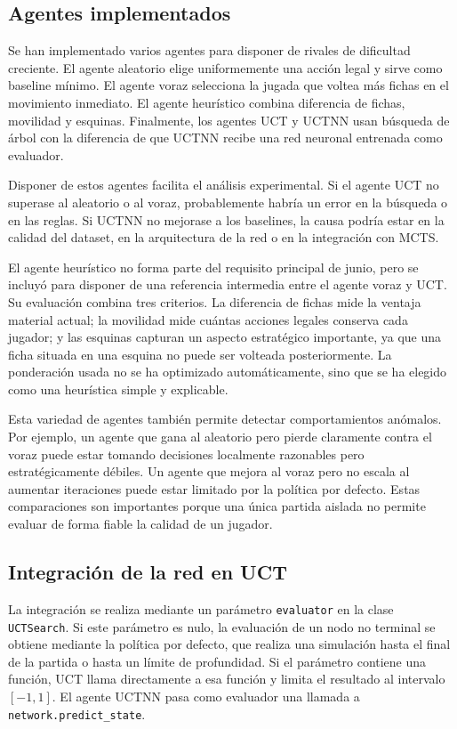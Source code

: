 \documentclass[conference,a4paper]{IEEEtran}
\begin{document}
\subsection{Agentes implementados}

Se han implementado varios agentes para disponer de rivales de dificultad
creciente. El agente aleatorio elige uniformemente una acción legal y sirve como
baseline mínimo. El agente voraz selecciona la jugada que voltea más fichas en
el movimiento inmediato. El agente heurístico combina diferencia de fichas,
movilidad y esquinas. Finalmente, los agentes UCT y UCTNN usan búsqueda de árbol
con la diferencia de que UCTNN recibe una red neuronal entrenada como evaluador.

Disponer de estos agentes facilita el análisis experimental. Si el agente UCT no
superase al aleatorio o al voraz, probablemente habría un error en la búsqueda o
en las reglas. Si UCTNN no mejorase a los baselines, la causa podría estar en la
calidad del dataset, en la arquitectura de la red o en la integración con MCTS.

El agente heurístico no forma parte del requisito principal de junio, pero se
incluyó para disponer de una referencia intermedia entre el agente voraz y UCT.
Su evaluación combina tres criterios. La diferencia de fichas mide la ventaja
material actual; la movilidad mide cuántas acciones legales conserva cada
jugador; y las esquinas capturan un aspecto estratégico importante, ya que una
ficha situada en una esquina no puede ser volteada posteriormente. La ponderación
usada no se ha optimizado automáticamente, sino que se ha elegido como una
heurística simple y explicable.

Esta variedad de agentes también permite detectar comportamientos anómalos. Por
ejemplo, un agente que gana al aleatorio pero pierde claramente contra el voraz
puede estar tomando decisiones localmente razonables pero estratégicamente
débiles. Un agente que mejora al voraz pero no escala al aumentar iteraciones
puede estar limitado por la política por defecto. Estas comparaciones son
importantes porque una única partida aislada no permite evaluar de forma fiable
la calidad de un jugador.

\subsection{Integración de la red en UCT}

La integración se realiza mediante un parámetro \texttt{evaluator} en la clase
\texttt{UCTSearch}. Si este parámetro es nulo, la evaluación de un nodo no
terminal se obtiene mediante la política por defecto, que realiza una simulación
hasta el final de la partida o hasta un límite de profundidad. Si el parámetro
contiene una función, UCT llama directamente a esa función y limita el resultado
al intervalo \([-1,1]\). El agente UCTNN pasa como evaluador una llamada a
\texttt{network.predict\_state}.
\end{document}
